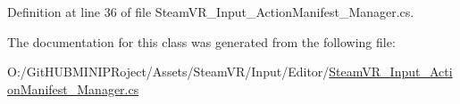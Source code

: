 Definition at line 36 of file Steam\+V\+R\+\_\+\+Input\+\_\+\+Action\+Manifest\+\_\+\+Manager.\+cs.



The documentation for this class was generated from the following file\+:\begin{DoxyCompactItemize}
\item 
O\+:/\+Git\+H\+U\+B\+M\+I\+N\+I\+P\+Roject/\+Assets/\+Steam\+V\+R/\+Input/\+Editor/\mbox{\hyperlink{_steam_v_r___input___action_manifest___manager_8cs}{Steam\+V\+R\+\_\+\+Input\+\_\+\+Action\+Manifest\+\_\+\+Manager.\+cs}}\end{DoxyCompactItemize}
